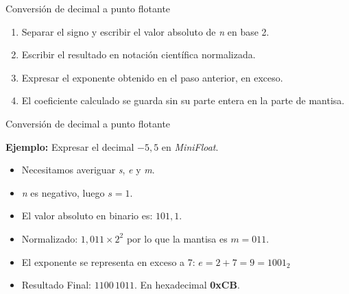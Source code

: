 \documentclass[11pt,a4paper,spanish]{beamer}
\begin{document}
\begin{frame}{Conversión de decimal a punto flotante}
\begin{enumerate}
    \item Separar el signo y escribir el valor absoluto de \textit{n} en base
        2.
    \item Escribir el resultado en notación científica normalizada.
    \item Expresar el exponente obtenido en el paso anterior, en exceso.
    \item El coeficiente calculado se guarda sin su parte entera en la parte
        de mantisa.
\end{enumerate}
\end{frame}

\begin{frame}{Conversión de decimal a punto flotante}

    \textbf{Ejemplo:} Expresar el decimal \(-5,5\) en \emph{MiniFloat}.

\begin{itemize}
    \item Necesitamos averiguar \textit{s}, \textit{e} y \textit{m}.
    \pause
\item \textit{n} es negativo, luego \(s = 1\). \pause
\item El valor absoluto en binario es: \(101,1\). \pause
\item Normalizado: \(1,011 \times 2^2\)  por lo que la mantisa es \(m=011\).
        \pause
    \item El exponente se representa en exceso a 7: \(e = 2 + 7 = 9 =
        1001_{2}\)
        \pause
    \item Resultado Final: \(1100\,1011\). En hexadecimal \textbf{0xCB}.
\end{itemize}
\end{frame}
\end{document}
